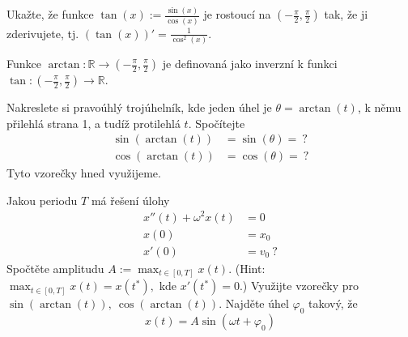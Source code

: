 \begin{úloha}
	Ukažte, že funkce $\tan(x):=\frac{\sin(x)}{\cos(x)}$ je rostoucí na $(-\frac{\pi}{2},\frac{\pi}{2})$ tak, že ji zderivujete, tj. $(\tan(x))'=\frac{1}{\cos^{2}(x)}$.
\end{úloha}
\begin{definice}[arctan]
  Funkce $\arctan\colon \mathbb{R}\to \left(-\frac{\pi}{2},\frac{\pi}{2}\right)$ je definovaná jako inverzní k funkci $\tan\colon \left(-\frac{\pi}{2},\frac{\pi}{2}\right)\to \mathbb{R}.$
\end{definice}

\begin{úloha}Nakreslete si pravoúhlý trojúhelník, kde jeden úhel je $\theta=\arctan(t)$, k němu přilehlá strana 1, a tudíž protilehlá $t$. Spočítejte
  \begin{align*}
  	\sin(\arctan(t)) &= \sin(\theta)=\ ? \\
  	\cos(\arctan(t)) &= \cos(\theta)=\ ?
  \end{align*}
  Tyto vzorečky hned využijeme.
\end{úloha}

\begin{úloha}\label{eq:harmonicky oscilator reseni} Jakou periodu $T$ má řešení úlohy
  \begin{align*}
  	x''(t)+\omega^{2}x(t) &= 0 \\
  	x(0) &= x_0 \\
	x'(0) &= v_0\ ?
  \end{align*}
  Spočtěte amplitudu $A:=\displaystyle\max_{t\in[0,T]}x(t).$ (Hint: $\displaystyle\max_{t\in[0,T]}x(t)=x(t^{*}),$ kde $x'(t^{*})=0$.) Využijte vzorečky pro $\sin(\arctan(t)),\ \cos(\arctan(t)).$ Najděte úhel $\varphi_0$ takový, že
  \begin{equation*}
    x(t)=A\sin(\omega t+\varphi_0)
  \end{equation*}
\end{úloha}

